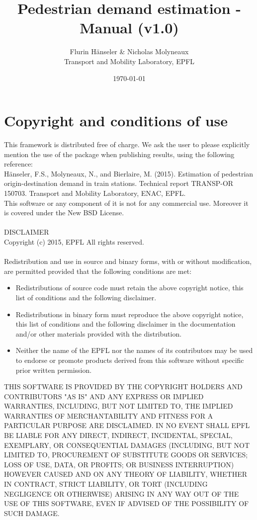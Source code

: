 \documentclass[a4paper,12pt]{article}
\begin{document}
\setlength{\parindent}{0pt}

\title{Pedestrian demand estimation - Manual (v1.0)}
\author{Flurin H\"anseler \& Nicholas Molyneaux \\ Transport and Mobility Laboratory, EPFL}
\date{\today}
\maketitle
\tableofcontents
\newpage
\section{Copyright and conditions of use}
This framework is distributed free of charge. We ask the user to please explicitly mention the use of the package when publishing results, using the following reference:\\
Hänseler, F.S., Molyneaux, N., and Bierlaire, M. (2015). Estimation of pedestrian origin-destination demand in train stations. Technical report TRANSP-OR 150703. Transport and Mobility Laboratory, ENAC, EPFL.\\
This software or any component of it is not for any commercial use. Moreover it is covered under the New BSD License.\\
\\
DISCLAIMER\\
Copyright (c) 2015, EPFL All rights reserved.\\
\\
Redistribution and use in source and binary forms, with or without modification, are permitted provided that the following conditions are met:
\begin{itemize}
\item Redistributions of source code must retain the above copyright notice, this list of conditions and the following disclaimer.
\item Redistributions in binary form must reproduce the above copyright notice, this list of conditions and the following disclaimer in the documentation and/or other materials provided with the distribution.
\item Neither the name of the EPFL nor the names of its contributors may be used to endorse or promote products derived from this software without specific prior written permission.
\end{itemize}
THIS SOFTWARE IS PROVIDED BY THE COPYRIGHT HOLDERS AND CONTRIBUTORS "AS IS" AND ANY EXPRESS OR IMPLIED WARRANTIES, INCLUDING, BUT NOT LIMITED TO, THE IMPLIED WARRANTIES OF MERCHANTABILITY AND FITNESS FOR A PARTICULAR PURPOSE ARE DISCLAIMED. IN NO EVENT SHALL EPFL BE LIABLE FOR ANY DIRECT, INDIRECT, INCIDENTAL, SPECIAL, EXEMPLARY, OR CONSEQUENTIAL DAMAGES (INCLUDING, BUT NOT LIMITED TO, PROCUREMENT OF SUBSTITUTE GOODS OR SERVICES; LOSS OF USE, DATA, OR PROFITS; OR BUSINESS INTERRUPTION) HOWEVER CAUSED AND ON ANY THEORY OF LIABILITY, WHETHER IN CONTRACT, STRICT LIABILITY, OR TORT (INCLUDING NEGLIGENCE OR OTHERWISE) ARISING IN ANY WAY OUT OF THE USE OF THIS SOFTWARE, EVEN IF ADVISED OF THE POSSIBILITY OF SUCH DAMAGE.
\newpage
\end{document}
